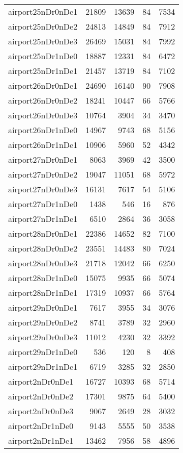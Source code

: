 \begin{longtable}{lrrrr}
airport25nDr0nDe1 & 21809 & 13639 & 84 & 7534 \\
airport25nDr0nDe2 & 24813 & 14849 & 84 & 7912 \\
airport25nDr0nDe3 & 26469 & 15031 & 84 & 7992 \\
airport25nDr1nDe0 & 18887 & 12331 & 84 & 6472 \\
airport25nDr1nDe1 & 21457 & 13719 & 84 & 7102 \\
airport26nDr0nDe1 & 24690 & 16140 & 90 & 7908 \\
airport26nDr0nDe2 & 18241 & 10447 & 66 & 5766 \\
airport26nDr0nDe3 & 10764 & 3904 & 34 & 3470 \\
airport26nDr1nDe0 & 14967 & 9743 & 68 & 5156 \\
airport26nDr1nDe1 & 10906 & 5960 & 52 & 4342 \\
airport27nDr0nDe1 & 8063 & 3969 & 42 & 3500 \\
airport27nDr0nDe2 & 19047 & 11051 & 68 & 5972 \\
airport27nDr0nDe3 & 16131 & 7617 & 54 & 5106 \\
airport27nDr1nDe0 & 1438 & 546 & 16 & 876 \\
airport27nDr1nDe1 & 6510 & 2864 & 36 & 3058 \\
airport28nDr0nDe1 & 22386 & 14652 & 82 & 7100 \\
airport28nDr0nDe2 & 23551 & 14483 & 80 & 7024 \\
airport28nDr0nDe3 & 21718 & 12042 & 66 & 6250 \\
airport28nDr1nDe0 & 15075 & 9935 & 66 & 5074 \\
airport28nDr1nDe1 & 17319 & 10937 & 66 & 5764 \\
airport29nDr0nDe1 & 7617 & 3955 & 34 & 3076 \\
airport29nDr0nDe2 & 8741 & 3789 & 32 & 2960 \\
airport29nDr0nDe3 & 11012 & 4230 & 32 & 3392 \\
airport29nDr1nDe0 & 536 & 120 & 8 & 408 \\
airport29nDr1nDe1 & 6719 & 3285 & 32 & 2850 \\
airport2nDr0nDe1 & 16727 & 10393 & 68 & 5714 \\
airport2nDr0nDe2 & 17301 & 9875 & 64 & 5400 \\
airport2nDr0nDe3 & 9067 & 2649 & 28 & 3032 \\
airport2nDr1nDe0 & 9143 & 5555 & 50 & 3538 \\
airport2nDr1nDe1 & 13462 & 7956 & 58 & 4896 \\

\end{longtable}
